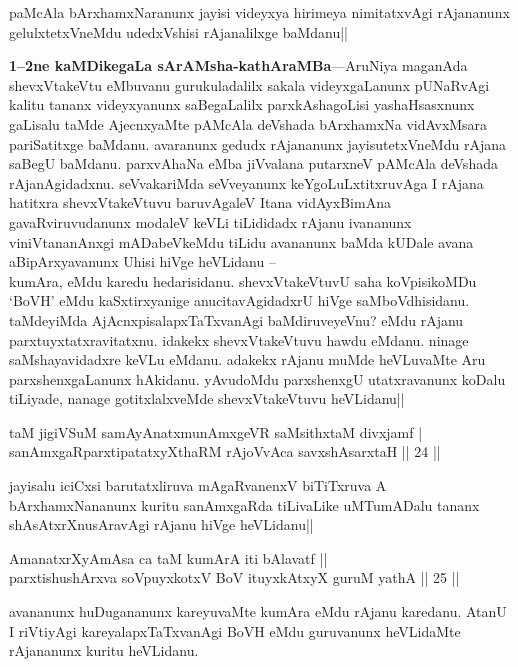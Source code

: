 \begin{artha}
paMcAla bArxhamxNaranunx jayisi videyxya hirimeya nimitatxvAgi 
rAjananunx gelulxtetxVneMdu udedxVshisi rAjanalilxge baMdanu||
\end{artha}

\textbf{1--2ne kaMDikegaLa sArAMsha-kathAraMBa}---AruNiya maganAda 
shevxVtakeVtu eMbuvanu gurukuladalilx sakala videyxgaLanunx pUNaRvAgi 
kalitu tananx videyxyanunx saBegaLalilx parxkAshagoLisi yashaHsasxnunx 
gaLisalu taMde AjecnxyaMte pAMcAla deVshada bArxhamxNa vidAvxMsara 
pariSatitxge baMdanu. avaranunx gedudx rAjananunx jayisutetxVneMdu 
rAjana saBegU baMdanu. parxvAhaNa eMba jiVvalana putarxneV pAMcAla 
deVshada rAjanAgidadxnu. seVvakariMda seVveyanunx keYgoLuLxtitxruvAga 
I rAjana hatitxra shevxVtakeVtuvu baruvAgaleV Itana vidAyxBimAna 
gavaRviruvudanunx modaleV keVLi tiLididadx rAjanu ivananunx 
viniVtananAnxgi mADabeVkeMdu tiLidu avananunx baMda kUDale avana 
aBipArxyavanunx Uhisi hiVge heVLidanu --\\
kumAra, eMdu karedu hedarisidanu. shevxVtakeVtuvU saha koVpisikoMDu 
`BoVH' eMdu kaSxtirxyanige anucitavAgidadxrU hiVge saMboVdhisidanu. 
taMdeyiMda AjAcnxpisalapxTaTxvanAgi baMdiruveyeVnu? eMdu rAjanu 
parxtuyxtatxravitatxnu. idakekx shevxVtakeVtuvu hawdu eMdanu. ninage 
saMshayavidadxre keVLu eMdanu. adakekx rAjanu muMde heVLuvaMte Aru 
parxshenxgaLanunx hAkidanu. yAvudoMdu parxshenxgU utatxravanunx koDalu 
tiLiyade, nanage gotitxlalxveMde shevxVtakeVtuvu heVLidanu||

\begin{shl}
taM jigiVSuM samAyAnatxmunAmxgeVR saMsithxtaM divxjamf | \\
sanAmxgaRparxtipatatxyXthaRM rAjoVvAca savxshAsarxtaH \hfill|| 24 || 
\end{shl}

\begin{artha}
jayisalu iciCxsi barutatxliruva mAgaRvanenxV biTiTxruva A 
bArxhamxNananunx kuritu sanAmxgaRda tiLivaLike uMTumADalu tananx 
shAsAtxrXnusAravAgi rAjanu hiVge heVLidanu||
\end{artha}

\begin{shl}
AmanatxrXyAmAsa ca taM kumArA iti bAlavatf || \\
parxtishushArxva soV\s puyxkotxV BoV ituyxkAtxyX guruM yathA \hfill|| 25 || 
\end{shl}

\begin{artha}
avananunx huDugananunx kareyuvaMte kumAra eMdu rAjanu karedanu. AtanU 
I riVtiyAgi kareyalapxTaTxvanAgi BoVH eMdu guruvanunx heVLidaMte 
rAjananunx kuritu heVLidanu.
\end{artha}

